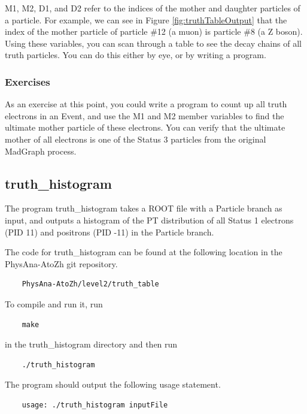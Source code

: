 \documentclass{article}
\begin{document}
M1, M2, D1, and D2 refer to the indices of the mother and daughter particles of a particle.
For example, we can see in Figure \ref{fig:truthTableOutput} that the index of the mother particle
of particle \#12 (a muon) is particle \#8 (a Z boson). Using these variables, you can scan through
a table to see the decay chains of all truth particles. You can do this either by eye, or by writing a program.

\subsubsection*{Exercises}

As an exercise at this point, you could write a program to count up all truth electrons in an Event,
and use the M1 and M2 member variables to find the ultimate mother particle of these electrons. You can
verify that the ultimate mother of all electrons is one of the Status 3 particles from the original MadGraph process.

\subsection{truth\_histogram}

The program truth\_histogram takes a ROOT file with a Particle branch as input, and outputs a histogram
of the PT distribution of all Status 1 electrons (PID 11) and positrons (PID -11) in the Particle branch.

\bigskip

The code for truth\_histogram can be found at the following location in the PhysAna-AtoZh git repository.

\begin{verbatim}
	PhysAna-AtoZh/level2/truth_table
\end{verbatim}

To compile and run it, run

\begin{verbatim}
	make
\end{verbatim} 

in the truth\_histogram directory and then run

\begin{verbatim}
	./truth_histogram
\end{verbatim}

The program should output the following usage statement.

\begin{verbatim}
	usage: ./truth_histogram inputFile
\end{verbatim}
\end{document}
